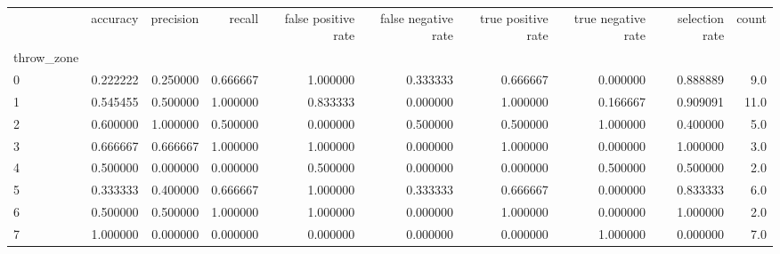 \begin{tabular}{lrrrrrrrrr}
\toprule
{} &  accuracy &  precision &    recall &  false positive rate &  false negative rate &  true positive rate &  true negative rate &  selection rate &  count \\
throw\_zone &           &            &           &                      &                      &                     &                     &                 &        \\
\midrule
0          &  0.222222 &   0.250000 &  0.666667 &             1.000000 &             0.333333 &            0.666667 &            0.000000 &        0.888889 &    9.0 \\
1          &  0.545455 &   0.500000 &  1.000000 &             0.833333 &             0.000000 &            1.000000 &            0.166667 &        0.909091 &   11.0 \\
2          &  0.600000 &   1.000000 &  0.500000 &             0.000000 &             0.500000 &            0.500000 &            1.000000 &        0.400000 &    5.0 \\
3          &  0.666667 &   0.666667 &  1.000000 &             1.000000 &             0.000000 &            1.000000 &            0.000000 &        1.000000 &    3.0 \\
4          &  0.500000 &   0.000000 &  0.000000 &             0.500000 &             0.000000 &            0.000000 &            0.500000 &        0.500000 &    2.0 \\
5          &  0.333333 &   0.400000 &  0.666667 &             1.000000 &             0.333333 &            0.666667 &            0.000000 &        0.833333 &    6.0 \\
6          &  0.500000 &   0.500000 &  1.000000 &             1.000000 &             0.000000 &            1.000000 &            0.000000 &        1.000000 &    2.0 \\
7          &  1.000000 &   0.000000 &  0.000000 &             0.000000 &             0.000000 &            0.000000 &            1.000000 &        0.000000 &    7.0 \\
\bottomrule
\end{tabular}
